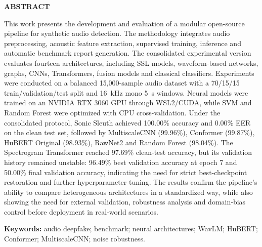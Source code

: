 \documentclass[12pt,a4paper]{article}
\begin{document}
\vspace{1cm}
\begin{center}\textbf{ABSTRACT}\end{center}
\vspace{0.5cm}

\begin{singlespace}
\noindent
This work presents the development and evaluation of a modular open-source
pipeline for synthetic audio detection. The methodology integrates audio
preprocessing, acoustic feature extraction, supervised training, inference and
automatic benchmark report generation. The consolidated experimental version
evaluates fourteen architectures, including SSL models, waveform-based
networks, graphs, CNNs, Transformers, fusion models and classical classifiers.
Experiments were conducted on a balanced 15,000-sample audio dataset with a
70/15/15 train/validation/test split and \SI{16}{\kilo\hertz} mono
\SI{5}{\second} windows. Neural models were trained on an NVIDIA RTX 3060 GPU
through WSL2/CUDA, while SVM and Random Forest were optimized with CPU
cross-validation. Under the consolidated protocol, Sonic Sleuth achieved 100.00\% accuracy
and 0.00\% EER on the clean test set, followed by MultiscaleCNN (99.96\%),
Conformer (99.87\%), HuBERT Original (98.93\%), RawNet2 and Random Forest
(98.04\%). The Spectrogram Transformer reached 97.69\% clean-test accuracy,
but its validation history remained unstable: 96.49\% best validation accuracy
at epoch 7 and 50.00\% final validation accuracy, indicating the need for
strict best-checkpoint restoration and further hyperparameter tuning. The results
confirm the pipeline's ability to compare heterogeneous architectures in a
standardized way, while also showing the need for external validation,
robustness analysis and domain-bias control before deployment in real-world
scenarios.

\vspace{0.4cm}
\noindent\textbf{Keywords:} audio deepfake; benchmark; neural architectures;
WavLM; HuBERT; Conformer; MultiscaleCNN; noise robustness.
\end{singlespace}

\newpage

\listoffigures
\newpage
\listoftables
\newpage

\end{document}
